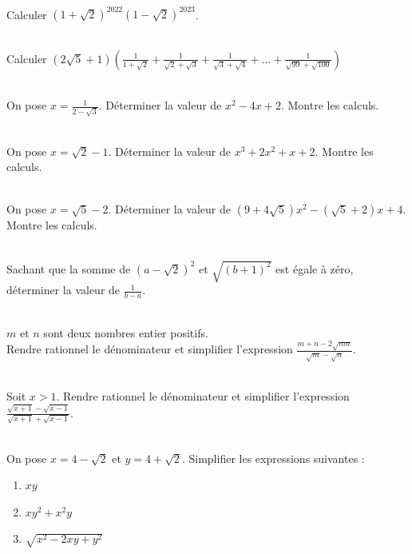 \documentclass[main.tex]{subfiles}
\begin{document}
\begin{exercise}\hfill \\
	Calculer $(1+\sqrt{2})^{2022}(1-\sqrt{2})^{2023}$.
\end{exercise}
\begin{exercise}\hfill \\
	Calculer $(2\sqrt{5}+1)\left(\frac{1}{1+\sqrt{2}}+\frac{1}{\sqrt{2}+\sqrt{3}}+ \frac{1}{\sqrt{3}+\sqrt{4}}+\ldots+\frac{1}{\sqrt{99}+\sqrt{100}}\right)$
\end{exercise}
\begin{exercise} \hfill \\
	On pose $x=\frac{1}{2-\sqrt{3}}$. Déterminer la valeur de $x^2-4x+2$. Montre les calculs.
\end{exercise}
\begin{exercise} \hfill \\
	On pose $x=\sqrt{2}-1$. Déterminer la valeur de $x^3+2x^2+x+2$. Montre les calculs.
\end{exercise}
\begin{exercise} \hfill \\
	On pose $x=\sqrt{5}-2$. Déterminer la valeur de $(9+4\sqrt{5})x^2-(\sqrt{5}+2)x+4$. Montre les calculs.
\end{exercise}
\begin{exercise}\hfill \\ 
	Sachant que la somme de $(a-\sqrt{2})^2$ et $\sqrt{(b+1)^2}$ est égale à zéro, déterminer la valeur de $\frac{1}{b-a}$.
\end{exercise}
\begin{exercise}\hfill \\
	$m$ et $n$ sont deux nombres entier positifs. \\
	Rendre rationnel le dénominateur et simplifier l'expression $\frac{m+n-2\sqrt{mn}}{\sqrt{m}-\sqrt{n}}$.
\end{exercise}
\begin{exercise}\hfill \\
	Soit $x>1$. Rendre rationnel le dénominateur et simplifier l'expression $\frac{\sqrt{x+1}-\sqrt{x-1}}{\sqrt{x+1}+\sqrt{x-1}}$.
\end{exercise} 
\begin{exercise}\hfill \\ 
	On pose $x=4-\sqrt{2}$ et $y=4+\sqrt{2}$. Simplifier les expressions suivantes :\hfill 
	\begin{enumerate}[label={\arabic*)},leftmargin=*] 
		\item  $xy$ 
		\item $xy^2+x^2y$
		\item $\sqrt{x^2-2xy+y^2}$
	\end{enumerate}  
\end{exercise}
\end{document}
